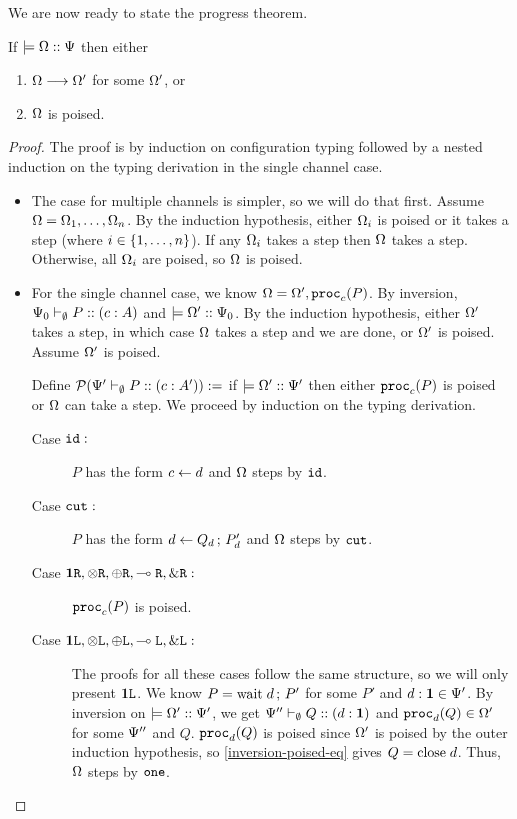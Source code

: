 We are now ready to state the progress theorem.

\begin{theorem}[Progress]
\label{base:progress}
If $\models {\Omega} :: {\Psi}$ then either
\begin{enumerate}
  \item $\Omega \longrightarrow \Omega'$ for some $\Omega'$, or
  \item $\Omega$ is poised.
\end{enumerate}
\end{theorem}

\begin{proof}
The proof is by induction on configuration typing followed by a nested induction on the typing derivation in the single channel case.

\begin{itemize}
  \item The case for multiple channels is simpler, so we will do that first. Assume $\Omega = \Omega_1, \ldots, \Omega_n$. By the induction hypothesis, either $\Omega_i$ is poised or it takes a step (where $i \in \lbrace1, \ldots, n\rbrace$). If any $\Omega_i$ takes a step then $\Omega$ takes a step. Otherwise, all $\Omega_i$ are poised, so $\Omega$ is poised.

  \item For the single channel case, we know $\Omega = \Omega', \mathtt{proc}_{c}(P)$. By inversion, ${\Psi_0} \vdash_{\emptyset} P :: (c : A)$ and $\models {\Omega'} :: {\Psi_0}$. By the induction hypothesis, either $\Omega'$ takes a step, in which case $\Omega$ takes a step and we are done, or $\Omega'$ is poised. Assume $\Omega'$ is poised.

  Define $\pred{\typeRecD{\ctx'}{\emptyset}{P}{c}{A'}} :=$ if $\models {\Omega'} :: {\Psi'}$ then either $\mathtt{proc}_{c}(P)$ is poised or $\Omega$ can take a step. We proceed by induction on the typing derivation.
    \begin{description}
      \item[Case $\texttt{id}:$] $P$ has the form $c \leftarrow d$ and $\Omega$ steps by $\texttt{id}$.
      \item[Case $\texttt{cut}:$] $P$ has the form $d \leftarrow Q_d \,;\, P'_d$ and $\Omega$ steps by $\texttt{cut}$.

      \item[Case $\mathbf{1}\texttt{R}, \otimes\texttt{R}, \oplus\texttt{R}, \multimap\texttt{R}, \&\texttt{R} :$] $\mathtt{proc}_{c}(P)$ is poised.

      \item[Case $\mathbf{1}\texttt{L}, \otimes\texttt{L}, \oplus\texttt{L}, \multimap\texttt{L}, \&\texttt{L} :$] The proofs for all these cases follow the same structure, so we will only present $\mathbf{1}\texttt{L}$. We know $P = \mathrm{wait}\;d \,;\, P'$ for some $P'$ and $d : \mathbf{1} \in \Psi'$. By inversion on $\models {\Omega'} :: {\Psi'}$, we get ${\Psi''} \vdash_{\emptyset} Q :: (d : \mathbf{1})$ and $\mathtt{proc}_{d}(Q) \in \Omega'$ for some $\Psi''$ and $Q$. $\mathtt{proc}_{d}(Q)$ is poised since $\Omega'$ is poised by the outer induction hypothesis, so \cref{inversion-poised-eq} gives $Q = \mathrm{close}\;d$. Thus, $\Omega$ steps by $\texttt{one}$.


\end{description}
\end{itemize}
\end{proof}
